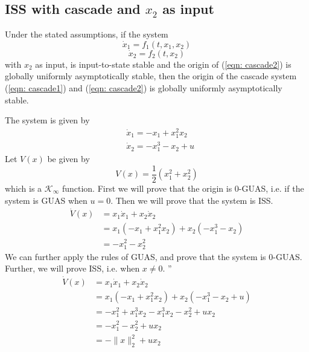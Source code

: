 \documentclass{article}
\begin{document}
\subsection{ISS with cascade and $x_2$ as input}
Under the stated assumptions, if the system 
\begin{equation}
	\dot{x}_1=f_1(t, x_1, x_2)
	\label{eqn: cascade1}
\end{equation}
\begin{equation}
	\dot{x}_2=f_2(t, x_2)
	\label{eqn: cascade2}
	\end{equation}
with $x_2$ as input, is input-to-state stable and the origin of (\ref{eqn: cascade2}) is globally uniformly asymptotically stable, then the origin of the cascade system (\ref{eqn: cascade1}) and (\ref{eqn: cascade2}) is globally uniformly asymptotically stable.
\begin{frm-ex}
The system is given by
$$
	\begin{aligned}
		 & \dot{x}_1=-x_1+x_1^2 x_2 \\
		 & \dot{x}_2=-x_1^3-x_2+u
	\end{aligned}
$$
Let $V(x)$ be given by
$$
	V(x)=\frac{1}{2}\left(x_1^2+x_2^2\right)
$$
which is a $\mathcal{K}_{\infty}$ function. First we will prove that the origin is 0-GUAS, i.e. if the system is GUAS when $u=0$. Then we will prove that the system is ISS.
\begin{equation*}
	\begin{split}
		\dot V(x) & = x_1 \dot x_1 + x_2 \dot x_2                  \\
		          & = x_1 (-x_1 + x_1^{2}x_2) + x_2 (-x_1^{3}-x_2) \\
		          & = -x_1^{2} - x_2^{2}
	\end{split}
\end{equation*}
We can further apply the rules of GUAS, and prove that the system is 0-GUAS. Further, we will prove ISS, i.e. when $x \neq 0$. ''
$$
	\begin{aligned}
		\dot{V}(x) & =x_1 \dot{x}_1+x_2 \dot{x}_2                                 \\
		           & =x_1\left(-x_1+x_1^2 x_2\right)+x_2\left(-x_1^3-x_2+u\right) \\
		           & =-x_1^2+x_1^3 x_2-x_1^3 x_2-x_2^2+u x_2                      \\
		           & =-x_1^2-x_2^2+u x_2                                          \\
		           & =-\|x\|_2^2+u x_2
	\end{aligned}
$$
\end{frm-ex}
\end{document}
